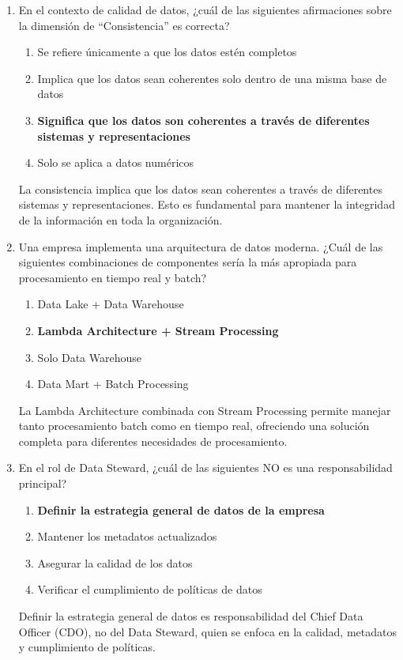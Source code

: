 \documentclass[12pt]{article}
\begin{document}
\begin{enumerate}[label=\arabic*.]

\item En el contexto de calidad de datos, ¿cuál de las siguientes afirmaciones sobre la dimensión de ``Consistencia'' es correcta?
\begin{enumerate}
    \item Se refiere únicamente a que los datos estén completos
    \item Implica que los datos sean coherentes solo dentro de una misma base de datos
    \item \textbf{Significa que los datos son coherentes a través de diferentes sistemas y representaciones}
    \item Solo se aplica a datos numéricos
\end{enumerate}
La consistencia implica que los datos sean coherentes a través de diferentes sistemas y representaciones. Esto es fundamental para mantener la integridad de la información en toda la organización.

\item Una empresa implementa una arquitectura de datos moderna. ¿Cuál de las siguientes combinaciones de componentes sería la más apropiada para procesamiento en tiempo real y batch?
\begin{enumerate}
    \item Data Lake + Data Warehouse
    \item \textbf{Lambda Architecture + Stream Processing}
    \item Solo Data Warehouse
    \item Data Mart + Batch Processing
\end{enumerate}
La Lambda Architecture combinada con Stream Processing permite manejar tanto procesamiento batch como en tiempo real, ofreciendo una solución completa para diferentes necesidades de procesamiento.

\item En el rol de Data Steward, ¿cuál de las siguientes NO es una responsabilidad principal?
\begin{enumerate}
    \item \textbf{Definir la estrategia general de datos de la empresa}
    \item Mantener los metadatos actualizados
    \item Asegurar la calidad de los datos
    \item Verificar el cumplimiento de políticas de datos
\end{enumerate}
Definir la estrategia general de datos es responsabilidad del Chief Data Officer (CDO), no del Data Steward, quien se enfoca en la calidad, metadatos y cumplimiento de políticas.


\end{enumerate}
\end{document}
